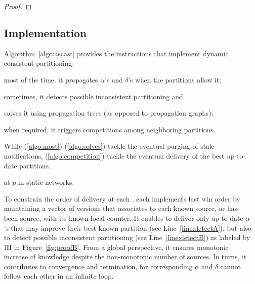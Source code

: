 \begin{theorem}
\end{theorem}

\begin{proof}
\end{proof}



\subsection{Implementation}

Algorithm~\ref{algo:ascast} provides the instructions that
implement dynamic consistent partitioning:
\begin{inparaenum}[(i)]
\item \label{algo:most} most of the time, it propagates $\alpha$'s and
  $\delta$'s when the partitions allow it;
\item \label{algo:sometimes} sometimes, it detects possible
  inconsistent partitioning and
\item \label{algo:solves}solves it using propagation trees (as opposed
  to propagation graphs);
\item \label{algo:competition} when required, it triggers competitions
  among neighboring partitions.
\end{inparaenum}
While (\ref{algo:most})-(\ref{algo:solves}) tackle the eventual purging of
stale notifications, (\ref{algo:competition}) tackle the eventual
delivery of the best up-to-date partitions.

\begin{algorithm}
  
  \caption{\label{algo:ascast}\NAME at \Process $p$ in static networks.}
\end{algorithm}

To constrain the order of delivery at each \process, each \process
implements last win order by maintaining a vector of versions that
associates to each known source, or has-been source, with its known
local counter. It enables \processes to deliver only up-to-date
$\alpha$'s that may improve their best known partition (see
Line~\ref{line:detectA}), but also to detect possible inconsistent
partitioning (see Line~\ref{line:detectB}) as labeled by III in
Figure~\ref{fig:proofB}. From a global perspective, it ensures
monotonic increase of knowledge despite the non-monotonic number of
sources. In turns, it contributes to convergence and termination, for
corresponding $\alpha$ and $\delta$ cannot follow each other in an
infinite loop.

